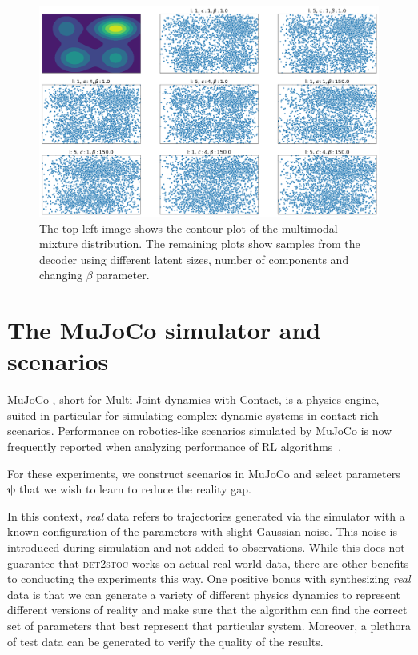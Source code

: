 \documentclass{kththesis}
\renewcommand{\vec}[1]{\boldsymbol{#1}}
\newcommand{\dettostoc}{\textsc{det2stoc}}
\begin{document}
\begin{figure}
\begin{center}
\includegraphics[width=0.8\linewidth]{img/multimodal_bivariate}
\caption{The top left image shows the contour plot of the multimodal mixture distribution. The remaining plots show samples from the decoder using different latent sizes, number of components and changing $\beta$ parameter.}
\label{fig_multimodal_bivariate}
\end{center}
\end{figure}

\fi

\section{The MuJoCo simulator and scenarios}

MuJoCo \parencite{todorov2012mujoco}, short for Multi-Joint dynamics with Contact, is a physics engine, suited in particular for simulating complex dynamic systems in contact-rich scenarios. Performance on robotics-like scenarios simulated by MuJoCo is now frequently reported when analyzing performance of RL algorithms~\parencite{duan2016benchmarking, popov2017data}.

For these experiments, we construct scenarios in MuJoCo and select parameters $\vec{\psi}$ that we wish to learn to reduce the reality gap. %

In this context, \textit{real} data refers to trajectories generated via the simulator with a known configuration of the parameters with slight Gaussian noise. This noise is introduced during simulation and not added to observations. While this does not guarantee that \dettostoc{} works on actual real-world data, there are other benefits to conducting the experiments this way. One positive bonus with synthesizing \emph{real} data is that we can generate a variety of different physics dynamics to represent different versions of reality and make sure that the algorithm can find the correct set of parameters that best represent that particular system. Moreover, a plethora of test data can be generated to verify the quality of the results.
\end{document}
